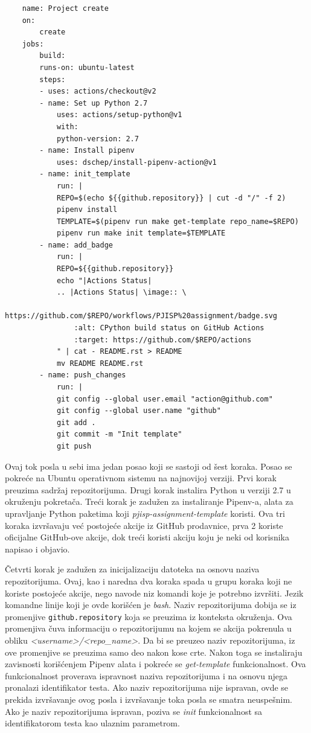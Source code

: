 \documentclass[12pt]{report}
\begin{document}
\begin{verbatim}
    name: Project create
    on:
        create
    jobs:
        build:
        runs-on: ubuntu-latest
        steps:
        - uses: actions/checkout@v2
        - name: Set up Python 2.7
            uses: actions/setup-python@v1
            with:
            python-version: 2.7
        - name: Install pipenv
            uses: dschep/install-pipenv-action@v1
        - name: init_template
            run: |
            REPO=$(echo ${{github.repository}} | cut -d "/" -f 2)
            pipenv install
            TEMPLATE=$(pipenv run make get-template repo_name=$REPO)
            pipenv run make init template=$TEMPLATE
        - name: add_badge
            run: |
            REPO=${{github.repository}}
            echo "|Actions Status|
            .. |Actions Status| \image:: \
                https://github.com/$REPO/workflows/PJISP%20assignment/badge.svg
                :alt: CPython build status on GitHub Actions
                :target: https://github.com/$REPO/actions
            " | cat - README.rst > README
            mv README README.rst
        - name: push_changes
            run: |
            git config --global user.email "action@github.com"
            git config --global user.name "github"
            git add .
            git commit -m "Init template"
            git push
\end{verbatim}

Ovaj tok posla u sebi ima jedan posao koji se sastoji od šest koraka. Posao se pokreće na Ubuntu operativnom sistemu na najnovijoj verziji. Prvi korak preuzima sadržaj repozitorijuma. Drugi korak instalira Python u verziji 2.7 u okruženju pokretača. Treći korak je zadužen za instaliranje Pipenv-a, alata za upravljanje Python paketima koji \textit{pjisp-assignment-template} koristi. Ova tri koraka izvršavaju već postojeće akcije iz GitHub prodavnice, prva 2 koriste oficijalne GitHub-ove akcije, dok treći koristi akciju koju je neki od korisnika napisao i objavio.

Četvrti korak je zadužen za inicijalizaciju datoteka na osnovu naziva repozitorijuma. Ovaj, kao i naredna dva koraka spada u grupu koraka koji ne koriste postojeće akcije, nego navode niz komandi koje je potrebno izvršiti. Jezik komandne linije koji je ovde korišćen je \textit{bash}. Naziv repozitorijuma dobija se iz promenjive \texttt{github.repository} koja se preuzima iz konteksta okruženja. Ova promenjiva čuva informaciju o repozitorijumu na kojem se akcija pokrenula u obliku \textit{<username>/<repo\_name>}. Da bi se preuzeo naziv repozitorijuma, iz ove promenjive se preuzima samo deo nakon kose crte. Nakon toga se instaliraju zavisnosti korišćenjem Pipenv alata i pokreće se \textit{get-template} funkcionalnost. Ova funkcionalnost proverava ispravnost naziva repozitorijuma i na osnovu njega pronalazi identifikator testa. Ako naziv repozitorijuma nije ispravan, ovde se prekida izvršavanje ovog posla i izvršavanje toka posla se smatra neuspešnim. Ako je naziv repozitorijuma ispravan, poziva se \textit{init} funkcionalnost sa identifikatorom testa kao ulaznim parametrom.
\end{document}
